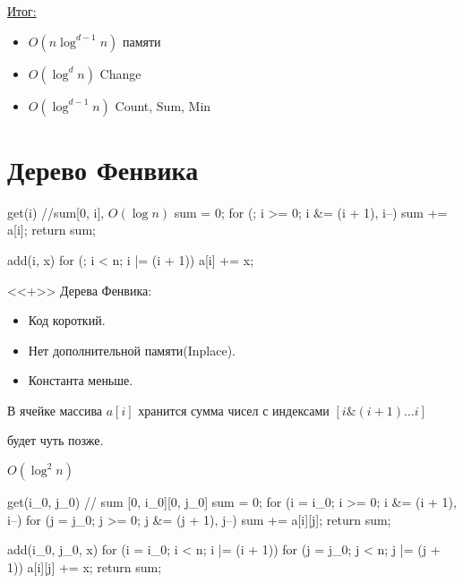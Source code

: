 \underline{Итог:}
\begin{itemize}
	\item $O(n\log^{d - 1}n)$ памяти
	\item $O(\log^d n)$ Change
	\item $O(\log^{d - 1} n)$ Count, Sum, Min   
\end{itemize}

\section{Дерево Фенвика}

\begin{cppcode}
get(i) { //sum[0, i], $O(\log n)$
		sum = 0;
		for (; i >= 0; i &= (i + 1), i--)
			sum += a[i];
    return sum;
}
\end{cppcode}

\begin{cppcode}
add(i, x){
	for (; i < n; i |= (i + 1))
		a[i] += x;
}
\end{cppcode}

<<+>> Дерева Фенвика:
\begin{itemize}
	\item Код короткий.
	\item Нет дополнительной памяти(Inplace).
	\item Константа меньше.
\end{itemize}

В ячейке массива $a[i]$ хранится сумма чисел с индексами $[i\&(i + 1) \dots i]$

\begin{center}  \end{center}

будет чуть позже.

\begin{center}  \end{center}

$O(\log^2 n)$

\begin{cppcode}
	get(i_0, j_0) { // sum [0, i_0][0, j_0]
		sum = 0;
		for (i = i_0; i >= 0; i &= (i + 1), i--)
			for (j = j_0; j >= 0; j &= (j + 1), j--)
				sum += a[i][j];
		return sum;
   }
\end{cppcode}

\begin{cppcode}
	add(i_0, j_0, x) { 
		for (i = i_0; i < n; i |= (i + 1))
			for (j = j_0; j < n; j |= (j + 1))
				a[i][j] += x;
		return sum;
   }
\end{cppcode}

